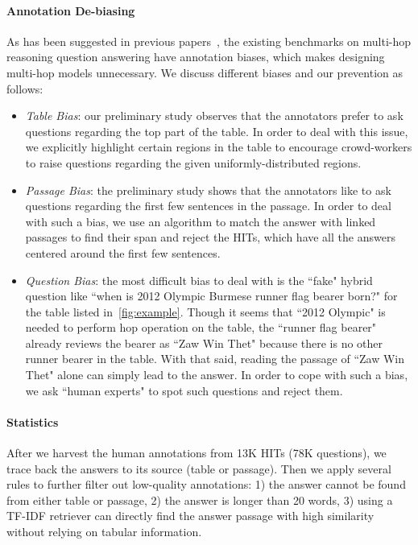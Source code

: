 \documentclass[11pt,a4paper]{article}
\begin{document}
\paragraph{Annotation De-biasing}
As has been suggested in previous papers~\cite{kaushik2018much,chen2019understanding,clark2019don}, the existing benchmarks on multi-hop reasoning question answering have annotation biases, which makes designing multi-hop models unnecessary. We discuss different biases and our prevention as follows:
\begin{itemize}
    \item \textit{Table Bias}: our preliminary study observes that the annotators prefer to ask questions regarding the top part of the table. In order to deal with this issue, we explicitly highlight certain regions in the table to encourage crowd-workers to raise questions regarding the given uniformly-distributed regions.
    \item \textit{Passage Bias}: the preliminary study shows that the annotators like to ask questions regarding the first few sentences in the passage. In order to deal with such a bias, we use an algorithm to match the answer with linked passages to find their span and reject the HITs, which have all the answers centered around the first few sentences.
    \item \textit{Question Bias}: the most difficult bias to deal with is the ``fake" hybrid question like ``when is 2012 Olympic Burmese runner flag bearer born?" for the table listed in~\autoref{fig:example}. Though it seems that ``2012 Olympic" is needed to perform hop operation on the table, the ``runner flag bearer" already reviews the bearer as ``Zaw Win Thet" because there is no other runner bearer in the table. With that said, reading the passage of ``Zaw Win Thet" alone can simply lead to the answer. In order to cope with such a bias, we ask ``human experts" to spot such questions and reject them.
\end{itemize}

\paragraph{Statistics}
After we harvest the human annotations from 13K HITs (78K questions), we trace back the answers to its source (table or passage). Then we apply several rules to further filter out low-quality annotations: 1) the answer cannot be found from either table or passage, 2) the answer is longer than 20 words, 3) using a TF-IDF retriever can directly find the answer passage with high similarity without relying on tabular information. 
\end{document}
